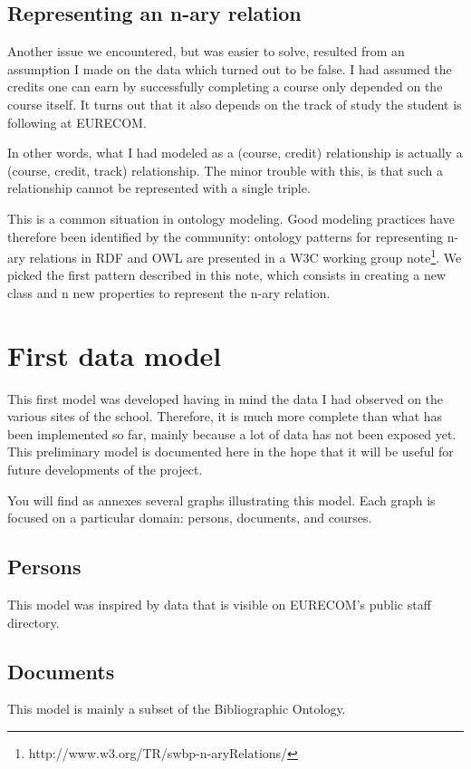 \documentclass[a4paper,11pt]{report}
\begin{document}
\subsection{Representing an n-ary relation}
Another issue we encountered, but was easier to solve, resulted from an assumption I made on the data which turned out to be false. I had assumed the credits one can earn by successfully completing a course only depended on the course itself. It turns out that it also depends on the track of study the student is following at EURECOM. 

In other words, what I had modeled as a (course, credit) relationship is actually a (course, credit, track) relationship. The minor trouble with this, is that such a relationship cannot be represented with a single triple. 

This is a common situation in ontology modeling. Good modeling practices have therefore been identified by the community: ontology patterns for representing n-ary relations in RDF and OWL are presented in a W3C working group note\footnote{http://www.w3.org/TR/swbp-n-aryRelations/}. We picked the first pattern described in this note, which consists in creating a new class and n new properties to represent the n-ary relation. 

\section{First data model} \label{sec:1stdatamodel}
This first model was developed having in mind the data I had observed on the various sites of the school. Therefore, it is much more complete than what has been implemented so far, mainly because a lot of data has not been exposed yet. This preliminary model is documented here in the hope that it will be useful for future developments of the project. 

You will find as annexes several graphs illustrating this model. Each graph is focused on a particular domain: persons, documents, and courses. 

\subsection{Persons}
This model was inspired by data that is visible on EURECOM's public staff directory. 

\subsection{Documents}
This model is mainly a subset of the Bibliographic Ontology. 
\end{document}
